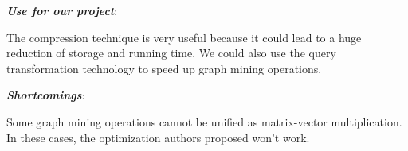 \begin{itemize*}
\item {\em \textbf{Use for our project}}:

The compression technique is very useful because it could lead to a huge reduction of storage and running time. We could also use the query transformation technology to speed up graph mining operations. \\ 


\item {\em \textbf{Shortcomings}}:

Some graph mining operations cannot be unified as matrix-vector multiplication. In these cases, the optimization authors proposed won’t work. 

\end{itemize*}

